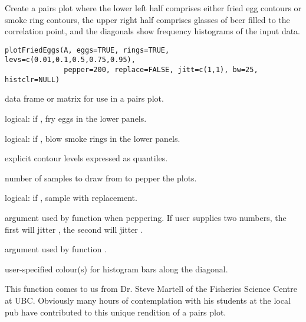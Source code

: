 \documentclass[letterpaper]{book}
\begin{document}
\begin{Description}\relax
Create a pairs plot where the lower left half comprises either 
fried egg contours or smoke ring contours, the upper right half 
comprises glasses of beer filled to the correlation point, and 
the diagonals show frequency histograms of the input data.
\end{Description}
\begin{Usage}
\begin{verbatim}
plotFriedEggs(A, eggs=TRUE, rings=TRUE, levs=c(0.01,0.1,0.5,0.75,0.95),
              pepper=200, replace=FALSE, jitt=c(1,1), bw=25, histclr=NULL) 
\end{verbatim}
\end{Usage}
\begin{Arguments}
\begin{ldescription}
\item[\code{A}] data frame or matrix for use in a pairs plot.
\item[\code{eggs}] logical: if , fry eggs in the lower panels.
\item[\code{rings}] logical: if , blow smoke rings in the lower panels.
\item[\code{levs}] explicit contour levels expressed as quantiles.
\item[\code{pepper}] number of samples to draw from  to pepper the plots.
\item[\code{replace}] logical: if , sample  with replacement.
\item[\code{jitt}] argument  used by function  when peppering.
If user supplies two numbers, the first will jitter , the second will 
jitter .
\item[\code{bw}] argument  used by function .
\item[\code{histclr}] user-specified colour(s) for histogram bars along the diagonal.
\end{ldescription}
\end{Arguments}
\begin{Details}\relax
This function comes to us from Dr. Steve Martell of the Fisheries Science 
Centre at UBC. Obviously many hours of contemplation with his students at
the local pub have contributed to this unique rendition of a pairs plot.
\end{Details}
\end{document}
